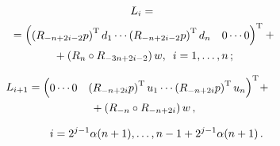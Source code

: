 \begin{multicols}{2}
\vspace*{-12pt}

\noindent
\begin{multline*}
{L}_i={}\\
{}=\begin{pmatrix} 
\left(R_{-n+2i-2}{p}\right)^{\mathrm{T}} {d}_1 \cdots 
\left(R_{-n+2i-2}{p}\right)^{\mathrm{T}} {d}_n&0 \cdots 0
\end{pmatrix}^{\mathrm{T}}+ {}\\
{}+
\left(R_n\circ R_{-3n+2i-2}\right){w},\enskip
i=1,\dots,n\,;
\end{multline*}

\vspace*{-12pt}

\noindent
\begin{multline*}
\hspace*{-8.5727pt}{L}_{i+1}=\begin{pmatrix} 
0 \cdots 0&\left(R_{-n+2i}{p}\right)^{\mathrm{T}} {u}_1 
\cdots \left(R_{-n+2i}{p}\right)^{\mathrm{T}}{u}_n
\end{pmatrix}^{\mathrm{T}}\!  
+{}\\
{}+\left(R_{-n}\circ R_{-n+2i}\right){w}\,,
\end{multline*}

\vspace*{-12pt}

\noindent
$$
\hspace*{8mm}i=2^{j-1}\alpha (n+1),\dots,n-1+2^{j-1}\alpha (n+1)\,.
$$


\end{multicols}
